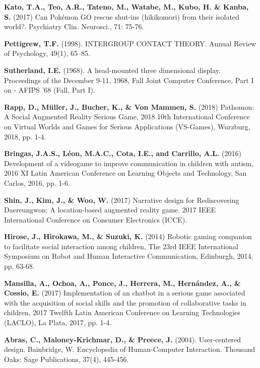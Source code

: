 \documentclass[runningheads]{llncs}
\begin{document}
\begin{thebibliography}{8}
 \textbf{Kato, T.A., Teo, A.R., Tateno, M., Watabe, M., Kubo, H. \& Kanba, S.} (2017) Can Pokémon GO rescue shut-ins (hikikomori) from their isolated world?. Psychiatry Clin. Neurosci., 71: 75-76. 

 \textbf{Pettigrew, T.F.} (1998). INTERGROUP CONTACT THEORY. Annual Review of Psychology, 49(1), 65–85. 

 \textbf{Sutherland, I.E.} (1968). A head-mounted three dimensional display. Proceedings of the December 9-11, 1968, Fall Joint Computer Conference, Part I on - AFIPS ’68 (Fall, Part I). 

 \textbf{Rapp, D., Müller, J., Bucher, K., \& Von Mammen, S.} (2018) Pathomon: A Social Augmented Reality Serious Game, 2018 10th International Conference on Virtual Worlds and Games for Serious Applications (VS-Games), Wurzburg, 2018, pp. 1-4. 

 \textbf{Bringas, J.A.S., Léon, M.A.C., Cota, I.E., and Carrillo, A.L.} (2016) Development of a videogame to improve communication in children with autism, 2016 XI Latin American Conference on Learning Objects and Technology, San Carlos, 2016, pp. 1-6. 

 \textbf{ Shin, J., Kim, J., \& Woo, W.} (2017) Narrative design for Rediscovering Daereungwon: A location-based augmented reality game. 2017 IEEE International Conference on Consumer Electronics (ICCE). 

 \textbf{Hirose, J., Hirokawa, M., \& Suzuki, K.} (2014) Robotic gaming companion to facilitate social interaction among children, The 23rd IEEE International Symposium on Robot and Human Interactive Communication, Edinburgh, 2014, pp. 63-68. 

 \textbf{Mansilla, A., Ochoa, A., Ponce, J., Herrera, M., Hernández, A., \& Cossio, E.} (2017) Implementation of an chatbot in a serious game associated with the acquisition of social skills and the promotion of collaborative tasks in children, 2017 Twelfth Latin American Conference on Learning Technologies (LACLO), La Plata, 2017, pp. 1-4.

 \textbf{Abras, C., Maloney-Krichmar, D., \& Preece, J.} (2004). User-centered design. Bainbridge, W. Encyclopedia of Human-Computer Interaction. Thousand Oaks: Sage Publications, 37(4), 445-456.


\end{thebibliography}
\end{document}
